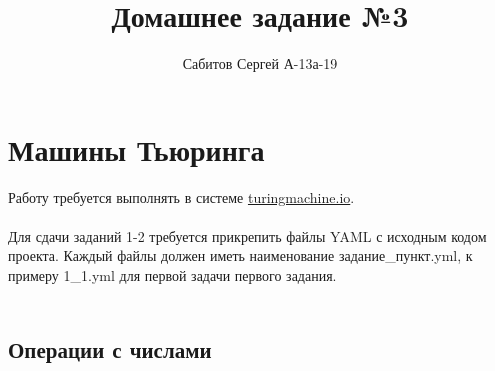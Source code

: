 \documentclass[a4paper,12pt]{article}
\title{Домашнее задание №3}
\author{Сабитов Сергей А-13а-19}
\begin{document}
\maketitle
\section{Машины Тьюринга}

Работу требуется выполнять в системе \url{turingmachine.io}. \\\\
Для сдачи заданий 1-2 требуется прикрепить файлы YAML с исходным кодом проекта. Каждый файлы должен иметь наименование задание\_пункт.yml, к примеру 1\_1.yml для первой задачи первого задания. \\\\

\subsection{Операции с числами}
\end{document}
